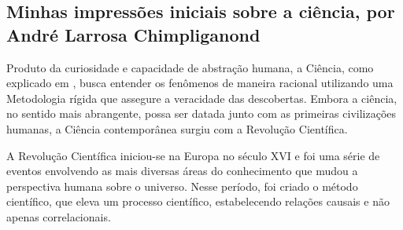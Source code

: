 \subsection{Minhas impressões iniciais sobre a ciência, por André Larrosa Chimpliganond}

Produto da curiosidade e capacidade de abstração humana, a Ciência, como explicado em \cite{aranha_temas_2009}, busca entender os fenômenos de maneira racional utilizando uma \gls{Metodologia} rígida que assegure a veracidade das descobertas. Embora a ciência, no sentido mais abrangente, possa ser datada junto com as primeiras civilizações humanas, a Ciência contemporânea surgiu com a Revolução Científica.

A Revolução Científica iniciou-se na Europa no século XVI e foi uma série de eventos envolvendo as mais diversas áreas do conhecimento que mudou a perspectiva humana sobre o universo. Nesse período, foi criado o método científico, que eleva um processo científico, estabelecendo relações causais e não apenas correlacionais.